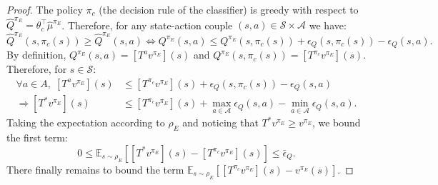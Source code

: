 \documentclass[english,utf8]{./hermes-journal}
\newcommand{\s}{\mathcal{S}}
\newcommand{\A}{\mathcal{A}}
\newcommand{\E}{\mathbb{E}}
\begin{document}
\begin{proof}
  The policy $\pi_c$ (the decision rule of the classifier) is greedy
  with respect to
  $\hat{Q}^{\pi_E}=\theta_c^\top\hat{\mu}^{\pi_E}$. Therefore, for any state-action couple
  $(s,a)\in\s\times \A$ we have:
  \begin{equation}
    \hat{Q}^{\pi_E}(s,\pi_c(s))\geq
    \hat{Q}^{\pi_E}(s,a)
    \Leftrightarrow
    Q^{\pi_E}(s,a) \leq Q^{\pi_E}(s,\pi_c(s)) +
    \epsilon_Q(s,\pi_c(s)) - \epsilon_Q(s,a).
  \end{equation}
  By definition, $Q^{\pi_E}(s,a) = [T^a v^{\pi_E}](s)$ and
  $Q^{\pi_E}(s,\pi_c(s)) = [T^{\pi_c} v^{\pi_E}](s)$. Therefore, for $s\in\s$:
  \begin{align}
    \forall a\in A,\; [T^a v^{\pi_E}](s) &\leq [T^{\pi_c}
    v^{\pi_E}](s) + \epsilon_Q(s,\pi_c(s))-\epsilon_Q(s,a)
    \\
    \Rightarrow [T^* v^{\pi_E}](s) &\leq [T^{\pi_c}
    v^{\pi_E}](s) + \max_{a\in \A}\epsilon_Q(s,a)-\min_{a\in
    \A}\epsilon_Q(s,a).
  \end{align}
  Taking the expectation according to $\rho_E$ and noticing that
  $T^* v^{\pi_E}\geq v^{\pi_E}$, we bound the first
  term:
  \begin{equation}
    0 \leq \E_{s\sim\rho_E}\left[ [T^* v^{\pi_E}](s) - [T^{\pi_c}
    v^{\pi_E}](s)\right] \leq \bar{\epsilon}_Q.
    \label{eq:proof:b1}
  \end{equation}
  There finally remains to bound the term $\E_{s\sim\rho_E}[[T^{\pi_c}v^{\pi_E}](s) -
  v^{\pi_E}(s)]$.


\end{proof}
\end{document}
